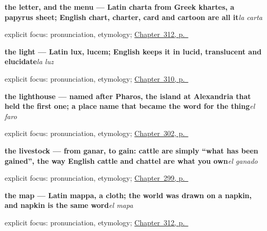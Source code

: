 \noindent\begin{minipage}[t]{\linewidth}
\raggedright
\textbf{the letter, and the menu — Latin charta from Greek khartes, a papyrus sheet; English chart, charter, card and cartoon are all it}\enspace\emph{la carta}\par
\footnotesize explicit focus: pronunciation, etymology; \hyperref[ch:lo-que-llevas]{Chapter~312, p.~\pageref*{ch:lo-que-llevas}}
\end{minipage}\par\smallskip

\noindent\begin{minipage}[t]{\linewidth}
\raggedright
\textbf{the light — Latin lux, lucem; English keeps it in lucid, translucent and elucidate}\enspace\emph{la luz}\par
\footnotesize explicit focus: pronunciation, etymology; \hyperref[ch:el-cuarto-y-la-mesa]{Chapter~310, p.~\pageref*{ch:el-cuarto-y-la-mesa}}
\end{minipage}\par\smallskip

\noindent\begin{minipage}[t]{\linewidth}
\raggedright
\textbf{the lighthouse — named after Pharos, the island at Alexandria that held the first one; a place name that became the word for the thing}\enspace\emph{el faro}\par
\footnotesize explicit focus: pronunciation, etymology; \hyperref[ch:calle-y-faro]{Chapter~302, p.~\pageref*{ch:calle-y-faro}}
\end{minipage}\par\smallskip

\noindent\begin{minipage}[t]{\linewidth}
\raggedright
\textbf{the livestock — from ganar, to gain: cattle are simply \textquotedblleft{}what has been gained\textquotedblright{}, the way English cattle and chattel are what you own}\enspace\emph{el ganado}\par
\footnotesize explicit focus: pronunciation, etymology; \hyperref[ch:la-granja]{Chapter~299, p.~\pageref*{ch:la-granja}}
\end{minipage}\par\smallskip

\noindent\begin{minipage}[t]{\linewidth}
\raggedright
\textbf{the map — Latin mappa, a cloth; the world was drawn on a napkin, and napkin is the same word}\enspace\emph{el mapa}\par
\footnotesize explicit focus: pronunciation, etymology; \hyperref[ch:lo-que-llevas]{Chapter~312, p.~\pageref*{ch:lo-que-llevas}}
\end{minipage}\par\smallskip

